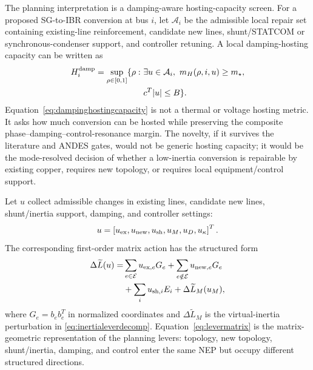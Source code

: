 \documentclass[journal]{IEEEtran}
\newcommand{\Lt}{\widetilde L}
\begin{document}
The planning interpretation is a damping-aware hosting-capacity screen. For a proposed SG-to-IBR conversion at bus $i$, let $\mathcal{A}_i$ be the admissible local repair set containing existing-line reinforcement, candidate new lines, shunt/STATCOM or synchronous-condenser support, and controller retuning. A local damping-hosting capacity can be written as
\begin{equation}
\begin{aligned}
H_i^{\rm damp}
=\sup_{\rho\in[0,1]}\{\rho:\ 
&\exists u\in\mathcal{A}_i,\ 
m_H(\rho,i,u)\ge m_\star,\\
&c^T|u|\le B\}.
\end{aligned}
\label{eq:dampinghostingcapacity}
\end{equation}
Equation~\eqref{eq:dampinghostingcapacity} is not a thermal or voltage hosting metric. It asks how much conversion can be hosted while preserving the composite phase--damping--control-resonance margin. The novelty, if it survives the literature and ANDES gates, would not be generic hosting capacity; it would be the mode-resolved decision of whether a low-inertia conversion is repairable by existing copper, requires new topology, or requires local equipment/control support.

Let $u$ collect admissible changes in existing lines, candidate new lines, shunt/inertia support, damping, and controller settings:
\begin{equation}
u=\left[u_{\rm ex},u_{\rm new},u_{\rm sh},u_M,u_D,u_\kappa\right]^T .
\label{eq:levervector}
\end{equation}
The corresponding first-order matrix action has the structured form
\begin{equation}
\begin{aligned}
\Delta \Lt(u)=&
\sum_{e\in\mathcal{E}}u_{{\rm ex},e}G_e
+\sum_{e\notin\mathcal{E}}u_{{\rm new},e}G_e\\
&+\sum_i u_{{\rm sh},i}E_i
+\Delta \Lt_M(u_M),
\end{aligned}
\label{eq:levermatrix}
\end{equation}
where $G_e=b_eb_e^T$ in normalized coordinates and $\Delta\Lt_M$ is the virtual-inertia perturbation in \eqref{eq:inertialeverdecomp}. Equation~\eqref{eq:levermatrix} is the matrix-geometric representation of the planning levers: topology, new topology, shunt/inertia, damping, and control enter the same NEP but occupy different structured directions.
\end{document}
